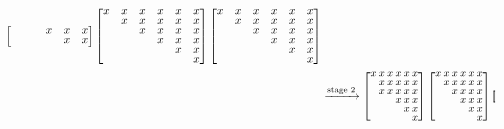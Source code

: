 \documentclass[final,leqno,onefignum,onetabnum]{siamltexmm}
\begin{document}
\begin{figure}
\begin{align*}
\begin{bmatrix}
              &   &   & x & x & x \\
              &   &   &   & x & x \\
            \end{bmatrix}
    \begin{bmatrix}
      x & x & x & x & x & x \\
      & x & x & x & x & x \\
      &   & x & x & x & x \\
      &   &   & x & x & x \\
      &   &   &   & x & x \\
      &   &   &   &   & x \\
    \end{bmatrix}
    \begin{bmatrix}
      x & x & x & x & x & x \\
      & x & x & x & x & x \\
      &   & x & x & x & x \\
      &   &   & x & x & x \\
      &   &   &   & x & x \\
      &   &   &   &   & x \\
    \end{bmatrix} \\
        & \xrightarrow{\normalsize \text{stage 2}}
          \small
          \setlength\arraycolsep{1pt}
          \renewcommand{\arraystretch}{0.7}
          \begin{bmatrix}
            x & x & x & x & x & x \\
            & x & x & x & x & x \\
            & x & x & x & x & x \\
            &   &   & x & x & x \\
            &   &   &   & x & x \\
            &   &   &   &   & x \\
          \end{bmatrix}
    \begin{bmatrix}
      x & x & x & x & x & x \\
      & x & x & x & x & x \\
      &   & x & x & x & x \\
      &   &   & x & x & x \\
      &   &   &   & x & x \\
      &   &   &   &   & x \\
    \end{bmatrix}
    \begin{bmatrix}

\end{bmatrix}
\end{align*}
\end{figure}
\end{document}
